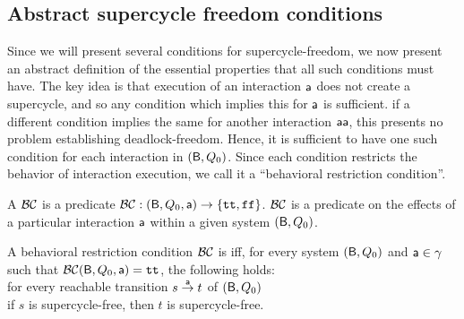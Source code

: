 \subsection{Abstract supercycle freedom conditions}

Since we will present several conditions for supercycle-freedom, we now present an abstract
definition of the essential properties that all such conditions must have.  The key idea is that
execution of an interaction $\act$ does not create a supercycle, and so any condition which implies 
this for $\act$ is sufficient. if a different condition implies the same for another interaction
$\actp$, this presents no problem \wrt establishing deadlock-freedom. Hence, it is sufficient to
have one such condition for each interaction in  $(\B,Q_0)$. Since each condition restricts the
behavior of interaction execution, we call it a ``behavioral restriction condition''.



A  $\BC$ is a predicate
$\BC: (\B, Q_0, \act) \to \set{\ttt, \fff}$.
\ed
%
$\BC$ is a predicate on the effects of a particular interaction $\act$ within a given system
$(\B, Q_0)$.

 \label{def:SC-free-preserving}
A behavioral restriction condition $\BC$ is  iff, for every system 
$(\B, Q_0)$ and $\act \in \gamma$ such that $\BC(\B, Q_0, \act) = \ttt$, the following holds:\\[2ex]
%
\ind \ind for every reachable transition $s \goesto[\act] t$ of $(\B, Q_0)$\\
\ind \ind \ind if $s$ is supercycle-free, then $t$ is supercycle-free.
\ed


